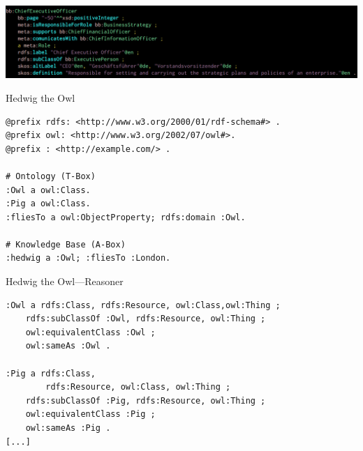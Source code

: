 \documentclass[14pt,aspectratio=1610]{beamer}
\begin{document}

\begin{frame}{}
\centering\includegraphics[width=1.05\textwidth,height=1.05\textheight,keepaspectratio]{img/bb-ceo.png}
\end{frame}



%

\begin{frame}[fragile]{Hedwig the Owl}
\small
\begin{lstlisting}
@prefix rdfs: <http://www.w3.org/2000/01/rdf-schema#> .
@prefix owl: <http://www.w3.org/2002/07/owl#>.
@prefix : <http://example.com/> .

# Ontology (T-Box)
:Owl a owl:Class.
:Pig a owl:Class.
:fliesTo a owl:ObjectProperty; rdfs:domain :Owl.

# Knowledge Base (A-Box)
:hedwig a :Owl; :fliesTo :London.
\end{lstlisting}
\end{frame}

\begin{frame}[fragile]{Hedwig the Owl---Reasoner}
\small
\begin{lstlisting}
:Owl a rdfs:Class, rdfs:Resource, owl:Class,owl:Thing ;
    rdfs:subClassOf :Owl, rdfs:Resource, owl:Thing ;
    owl:equivalentClass :Owl ;
    owl:sameAs :Owl .

:Pig a rdfs:Class,
        rdfs:Resource, owl:Class, owl:Thing ;
    rdfs:subClassOf :Pig, rdfs:Resource, owl:Thing ;
    owl:equivalentClass :Pig ;
    owl:sameAs :Pig .
[...]
\end{lstlisting}
\end{frame}
\end{document}

